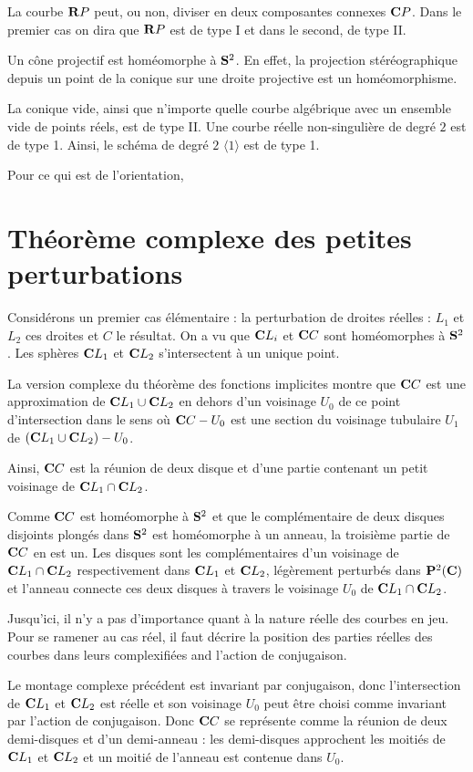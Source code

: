 \documentclass{livre}
\begin{document}
La courbe $\mathbf{R} P$ peut, ou non, diviser en deux composantes connexes $\mathbf{C} P$. Dans le premier cas on dira que $\mathbf{R} P$ est de type I et dans le second, de type II.

Un cône projectif est homéomorphe à $\mathbf{S}^{2}$. En effet, la projection stéréographique depuis un point de la conique sur une droite projective est un homéomorphisme.

La conique vide, ainsi que n'importe quelle courbe algébrique avec un ensemble vide de points réels, est de type II.  Une courbe réelle non-singulière de degré $2$ est de type 1. Ainsi, le schéma de degré $2$ $\langle 1\rangle$ est de type 1.

Pour ce qui est de l'orientation, 

\section{Théorème complexe des petites perturbations}

Considérons un premier cas élémentaire : la perturbation de droites réelles : $L_1$ et $L_2$ ces droites et $C$ le résultat. On a vu que $\mathbf{C} L_i$ et $\mathbf{C} C$ sont homéomorphes à $\mathbf{S}^{2}$. Les sphères $\mathbf{C} L_1$ et $\mathbf{C} L_2$ s'intersectent à un unique point.

La version complexe du théorème des fonctions implicites montre que $\mathbf{C} C$ est une approximation de $\mathbf{C} L_1\cup \mathbf{C} L_2$ en dehors d'un voisinage $U_0$ de ce point d'intersection dans le sens où $\mathbf{C} C-U_0$ est une section du voisinage tubulaire $U_1$ de $(\mathbf{C} L_1 \cup \mathbf{C} L_2)-U_0$.

Ainsi, $\mathbf{C} C$ est la réunion de deux disque et d'une partie contenant un petit voisinage de $\mathbf{C} L_1 \cap \mathbf{C} L_2$.

Comme $\mathbf{C} C$ est homéomorphe à $\mathbf{S}^{2}$ et que le complémentaire de deux disques disjoints plongés dans $\mathbf{S}^{2}$ est homéomorphe à un anneau, la troisième partie de $\mathbf{C} C$ en est un. Les disques sont les complémentaires d'un voisinage de $\mathbf{C} L_1\cap \mathbf{C} L_2$ respectivement dans $\mathbf{C} L_1$ et $\mathbf{C} L_2$, légèrement perturbés dans $\mathbf{P}^{2}(\mathbf{C})$ et l'anneau connecte ces deux disques à travers le voisinage $U_0$ de $\mathbf{C} L_1\cap \mathbf{C} L_2$.


Jusqu'ici, il n'y a pas d'importance quant à la nature réelle des courbes en jeu.
Pour se ramener au cas réel, il faut décrire la position des parties réelles des courbes dans leurs complexifiées and l'action de conjugaison.

Le montage complexe précédent est invariant par conjugaison, donc l'intersection de $\mathbf{C} L_1$ et $\mathbf{C} L_2$ est réelle et son voisinage $U_0$ peut être choisi comme invariant par l'action de conjugaison.
Donc $\mathbf{C} C$ se représente comme la réunion de deux demi-disques et d'un demi-anneau : les demi-disques approchent les moitiés de $\mathbf{C} L_1$ et $\mathbf{C} L_2$ et un moitié de l'anneau est contenue dans $U_0$.
\end{document}
